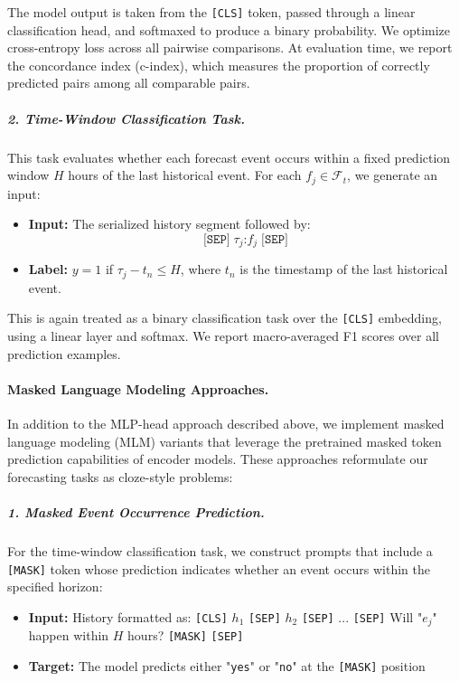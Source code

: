 The model output is taken from the \texttt{[CLS]} token, passed through a linear classification head, and softmaxed to produce a binary probability. 
We optimize cross-entropy loss across all pairwise comparisons. 
At evaluation time, we report the concordance index (c-index), which measures the proportion of correctly predicted pairs among all comparable pairs.

\subparagraph{2. Time-Window Classification Task.}
This task evaluates whether each forecast event occurs within a fixed prediction window $H$ hours of the last historical event. 
For each $f_j \in \mathcal{F}_t$, we generate an input:

\begin{itemize}
    \item \textbf{Input:} The serialized history segment followed by:
    \begin{equation}
        \texttt{[SEP]} \; \tau_j\texttt{:}f_j \; \texttt{[SEP]}
    \end{equation}
    \item \textbf{Label:} $y = 1$ if $\tau_j - t_n \leq H$, where $t_n$ is the timestamp of the last historical event.
\end{itemize}

This is again treated as a binary classification task over the \texttt{[CLS]} embedding, using a linear layer and softmax. 
We report macro-averaged F1 scores over all prediction examples.

\paragraph{Masked Language Modeling Approaches.}
In addition to the MLP-head approach described above, we implement masked language modeling (MLM) variants that leverage the pretrained masked token prediction capabilities of encoder models. These approaches reformulate our forecasting tasks as cloze-style problems:

\subparagraph{1. Masked Event Occurrence Prediction.}
For the time-window classification task, we construct prompts that include a \texttt{[MASK]} token whose prediction indicates whether an event occurs within the specified horizon:

\begin{itemize}
    \item \textbf{Input:} History formatted as: \texttt{[CLS]} $h_1$ \texttt{[SEP]} $h_2$ \texttt{[SEP]} ... \texttt{[SEP]} Will "$e_j$" happen within $H$ hours? \texttt{[MASK]} \texttt{[SEP]}
    \item \textbf{Target:} The model predicts either "\texttt{yes}" or "\texttt{no}" at the \texttt{[MASK]} position
\end{itemize}

